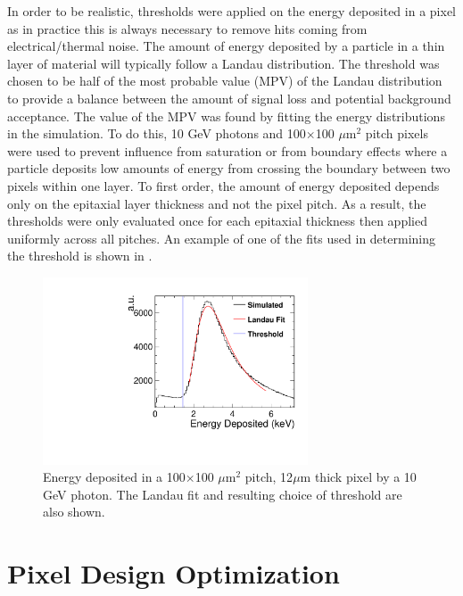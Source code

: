 In order to be realistic, thresholds were applied on the energy deposited in a pixel as in practice this is always necessary to remove hits coming from electrical/thermal noise. The amount of energy deposited by a particle in a thin layer of material will typically follow a Landau distribution. The threshold was chosen to be half of the most probable value (MPV) of the Landau distribution to provide a balance between the amount of signal loss and potential background acceptance. The value of the MPV was found by fitting the energy distributions in the simulation. To do this, 10 GeV photons and 100$\times$100 $\mu$m$^2$ pitch pixels were used to prevent influence from saturation or from boundary effects where a particle deposits low amounts of energy from crossing the boundary between two pixels within one layer. To first order, the amount of energy deposited depends only on the epitaxial layer thickness and not the pixel pitch. As a result, the thresholds were only evaluated once for each epitaxial thickness then applied uniformly across all pitches. An example of one of the fits used in determining the threshold is shown in .

\begin{figure}
  \centering
  \includegraphics[width=0.7\textwidth,keepaspectratio]{DECALStudies/fig/Landau_100x12_10GeV.pdf}
  \caption{Energy deposited in a 100$\times$100 $\mu$m$^2$ pitch, 12$\mu$m thick pixel by a 10 GeV photon. The Landau fit and resulting choice of threshold are also shown.}
  \label{fig:thresholdfit}
\end{figure}


\section{Pixel Design Optimization}

